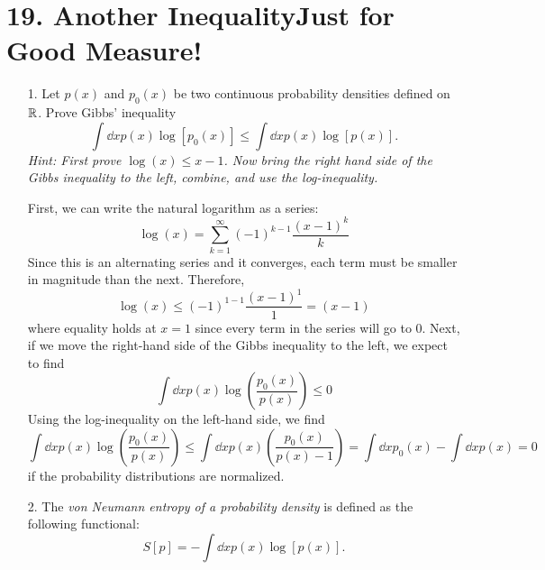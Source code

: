 \documentclass[a4paper,twoside]{article}
\begin{document}
\section*{19. Another Inequality\textemdash Just for Good Measure!}
\begin{itemize}
    \item[1.] Let $ p(x) $ and $ p_0(x) $ be two continuous probability densities defined on $ \mathbb{R} $. Prove Gibbs' inequality
        \begin{equation}
            \int \dd{x} p(x) \log[p_0(x)] \leq \int \dd{x} p(x) \log[p(x)].
        \end{equation}
        \textit{Hint: First prove $ \log(x) \leq x-1 $. Now bring the right hand side of the Gibbs inequality to the left, combine, and use the log-inequality.}
        \begin{problem}
            First, we can write the natural logarithm as a series:
            \begin{equation}
                \log(x) = \sum_{k=1}^{\infty} (-1)^{k-1} \frac{(x-1)^k}{k}
            \end{equation}
            Since this is an alternating series and it converges, each term must be smaller in magnitude than the next. Therefore,
            \begin{equation}
                \log(x) \leq (-1)^{1-1} \frac{(x-1)^1}{1} = (x-1)
            \end{equation}
            where equality holds at $ x = 1 $ since every term in the series will go to $ 0 $. Next, if we move the right-hand side of the Gibbs inequality to the left, we expect to find
            \begin{equation}
                \int \dd{x} p(x) \log(\frac{p_0(x)}{p(x)}) \leq 0
            \end{equation}
            Using the log-inequality on the left-hand side, we find
            \begin{equation}
                \int \dd{x} p(x) \log(\frac{p_0(x)}{p(x)}) \leq \int \dd{x} p(x) \left( \frac{p_0(x)}{p(x) - 1} \right) = \int \dd{x} p_0(x) - \int \dd{x} p(x) = 0
            \end{equation}
            if the probability distributions are normalized.
        \end{problem}
    \item[2.] The \textit{von Neumann entropy of a probability density} is defined as the following functional:
        \begin{equation}
            S[p] = - \int \dd{x} p(x) \log[p(x)].

\end{equation}
\end{itemize}
\end{document}
